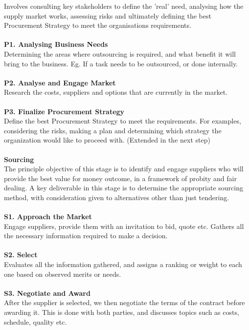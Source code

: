 \documentclass[a4paper,10pt]{article}
\begin{document}
Involves consulting key stakeholders to define the 'real' need, analysing how the supply market works, assessing risks and ultimately defining the best Procurement Strategy to meet the organisations requirements. \\\\
\textbf{P1. Analysing Business Needs} \\ 
Determining the areas where outsourcing is required, and what benefit it will bring to the business. Eg. If a task needs to be outsourced, or done internally. \\\\
\textbf{P2. Analyse and Engage Market}\\
Research the costs, suppliers and options that are currently in the market. \\\\
\textbf{P3. Finalize Procurement Strategy}\\
Define the best Procurement Strategy to meet the requirements. For examples, considering the risks, making a plan and determining which strategy the organization would like to proceed with. (Extended in the next step) \\\\ 
\textcolor{BlueGreen}{\textbf{Sourcing}} \\
The principle objective of this stage is to identify and engage suppliers who will provide the best value for money outcome, in a framework of probity and fair dealing. A key deliverable in this stage is to determine the appropriate sourcing method, with consideration given to alternatives other than just tendering. \\\\
\textbf{S1. Approach the Market} \\
Engage suppliers, provide them with an invitation to bid, quote etc. Gathers all the necessary information required to make a decision. \\\\
\textbf{S2. Select} \\ 
Evaluates all the information gathered, and assigns a ranking or weight to each one based on observed merits or needs. \\\\ 
\textbf{S3. Negotiate and Award} \\ 
After the supplier is selected, we then negotiate the terms of the contract before awarding it. This is done with both parties, and discusses topics such as costs, schedule, quality etc. \\\\
\end{document}
